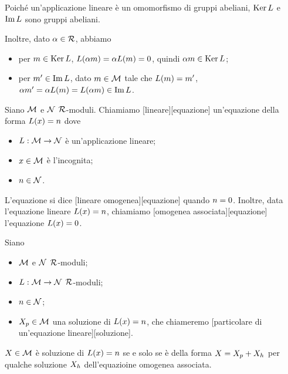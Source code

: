 \Proof Poich\'e un'applicazione lineare \`e un omomorfismo di gruppi
abeliani, $\operatorname{Ker}{L}$ e $\operatorname{Im}{L}$ sono gruppi abeliani.
\par Inoltre, dato $\alpha \in \mathcal{R}$, abbiamo
\begin{itemize}
	\item per $m \in \operatorname{Ker}{L}$,
	$L(\alpha m) =
	\alpha L(m) = 0$, quindi
	$\alpha m \in \operatorname{Ker}{L}$;
	\item per $m' \in \operatorname{Im}{L}$,
	dato $m \in \mathcal{M}$ tale che
	$L(m) = m'$,
	$\alpha m' =
	\alpha L(m) =
	L(\alpha m) \in \operatorname{Im}{L}$. \EndProof
\end{itemize}
\begin{Definition}
	Siano $\mathcal{M}$ e $\mathcal{N}$ $\mathcal{R}$-moduli. Chiamiamo [lineare][equazione] un'equazione della forma $L(x) = n$ dove
	\begin{itemize}
		\item $L: \mathcal{M} \rightarrow \mathcal{N}$ \`e un'applicazione lineare;
		\item $x \in \mathcal{M}$ \`e l'incognita;
		\item $n \in \mathcal{N}$.
	\end{itemize}
	L'equazione si dice [lineare omogenea][equazione] quando $n = 0$. Inoltre, data l'equazione lineare $L(x) = n$, chiamiamo [omogenea associata][equazione] l'equazione $L(x) = 0$.
\end{Definition}
\begin{Theorem}
	Siano
	\begin{itemize}
		\item $\mathcal{M}$ e $\mathcal{N}$ $\mathcal{R}$-moduli;
		\item $L: \mathcal{M} \rightarrow \mathcal{N}$ $\mathcal{R}$-moduli;
		\item $n \in \mathcal{N}$;
		\item ${X_p} \in \mathcal{M}$ una soluzione di $L(x) = n$, che chiameremo [particolare di un'equazione lineare][soluzione].
	\end{itemize}
	$X \in \mathcal{M}$ \`e soluzione di $L(x) = n$ se e solo se \`e della forma $X = {X_p} + {X_h}$ per qualche soluzione ${X_h}$ dell'equazioine omogenea associata.
\end{Theorem}
